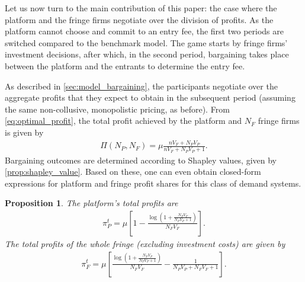 \documentclass[a4paper]{article}
\newtheorem{proposition}{Proposition}
\begin{document}
Let us now turn to the main contribution of this paper: the case where the platform and the fringe firms negotiate over the division of profits.
As the platform cannot choose and commit to an entry fee, the first two periods are switched compared to the benchmark model.
The game starts by fringe firms' investment decisions, after which, in the second period, bargaining takes place between the platform and the entrants to determine the entry fee.

As described in \cref{sec:model_bargaining}, the participants negotiate over the aggregate profits that they expect to obtain in the subsequent period (assuming the same non-collusive, monopolistic pricing, as before).
From \cref{eq:optimal_profit}, the total profit achieved by the platform and $N_F$ fringe firms is given by
\begin{align*}
    \Pi(N_P, N_F) = \mu \frac{n V_F + N_P V_P}{n V_F + N_P V_P + 1}.
\end{align*}
Bargaining outcomes are determined according to Shapley values, given by \cref{prop:shapley_value}.
Based on these, one can even obtain closed-form expressions for platform and fringe profit shares for this class of demand systems.
\begin{proposition}
    \label{prop:platform_profits_bargaining}
    The platform's total profits are
    \begin{align*}
        \pi^t_P = \mu \left[ 1 - \frac{\log \left(1 + \frac{N_F V_F}{N_P V_P + 1} \right)}{N_F V_F} \right].
    \end{align*}
    The total profits of the whole fringe (excluding investment costs) are given by
    \begin{align*}
        \pi^t_F = \mu \left[ \frac{\log \left( 1 + \frac{N_F V_F}{N_P V_P + 1} \right)}{N_F V_F} - \frac{1}{N_P V_P + N_F V_F + 1} \right].
    \end{align*}
\end{proposition}
\end{document}
